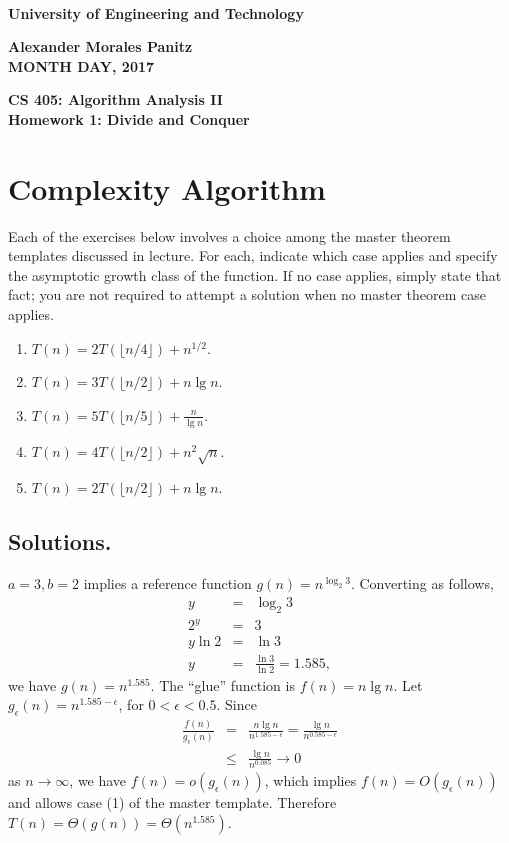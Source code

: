 \documentclass{article}%
\begin{document}
\begin{flushleft}
\textbf{\\ University of Engineering and Technology}
\end{flushleft}

\begin{flushright}
\textbf{Alexander Morales Panitz \\
MONTH DAY, 2017}
\end{flushright}

\begin{center}
\textbf{CS 405: Algorithm Analysis II \\
Homework 1: Divide and Conquer} \\
\end{center}
\section*{Complexity Algorithm}
Each of the exercises below involves a choice among the master theorem templates discussed in lecture.
For each, indicate which case applies and specify the asymptotic growth class of the function.  If no
case applies, simply state that fact; you are not required to attempt a solution when no master theorem case
applies.

\begin{enumerate}
\item $T(n) = 2 T(\lfloor n/4 \rfloor) + n^{1/2}$.
\item $T(n) = 3 T(\lfloor n/2 \rfloor) + n \lg n$.
\item $T(n) = 5 T(\lfloor n/5 \rfloor) + \frac{n}{\lg n}$.
\item $T(n) = 4 T(\lfloor n/2 \rfloor) + n^2 \sqrt{n}$.
\item $T(n) = 2 T(\lfloor n/2 \rfloor) + n \lg n$.
\end{enumerate}

\subsection*{Solutions.}
$a = 3, b = 2$ implies a reference function $g(n) = n^{\log_2 3}$. Converting as follows,
\begin{eqnarray*}
y & = & \log_2 3 \\
2^y & = & 3 \\
y \ln 2 & = & \ln 3 \\
y & = & \frac{\ln 3}{\ln 2} = 1.585,
\end{eqnarray*}
we have $g(n) = n^{1.585}$.  The ``glue'' function is $f(n) = n \lg n$.  Let $g_\epsilon (n) = n^{1.585 - \epsilon}$, for 
$0 < \epsilon < 0.5$. Since
\begin{eqnarray*}
\frac{f(n)}{g_\epsilon (n)} & = & \frac{n \lg n}{n^{1.585 - \epsilon}} = \frac{\lg n}{n^{0.585 - \epsilon}} \\
 & \leq & \frac{\lg n}{n^{0.085}} \rightarrow 0
\end{eqnarray*}
as $n \rightarrow \infty$, we have $f(n) = o(g_\epsilon (n))$, which implies $f(n) = O(g_\epsilon (n))$ and allows case (1) of the 
master template.  Therefore $T(n) = \Theta(g(n)) = \Theta(n^{1.585})$.
\end{document}
